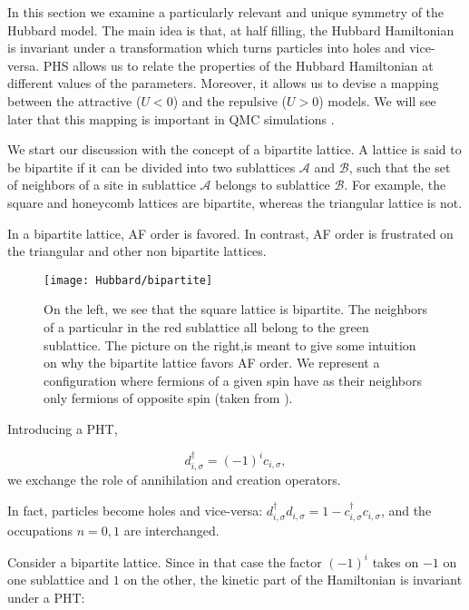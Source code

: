 In this section we examine a particularly relevant and unique symmetry of the Hubbard model.
The main idea is that, at half filling, the Hubbard Hamiltonian is invariant under a transformation which turns particles into holes and vice-versa.
\ac{PHS} allows us to relate the properties of the Hubbard Hamiltonian at different values of the parameters.
Moreover, it allows us to devise a mapping between the attractive ($U < 0$) and the repulsive ($U > 0$) models.
We will see later that this mapping is important in QMC simulations \cite{alavi_quantum_2016}.

We start our discussion with the concept of a bipartite lattice.
A lattice is said to be bipartite if it can be divided into two sublattices $\mathcal{A}$ and $\mathcal{B}$, such that the set of neighbors of a site in sublattice $\mathcal{A}$ belongs to sublattice $\mathcal{B}$.
For example, the square and honeycomb lattices are bipartite, whereas the triangular lattice is not.

In a bipartite lattice, \ac{AF} order is favored.
In contrast, AF order is frustrated on the triangular and other non bipartite lattices.

\begin{figure}[H]\label{fig:bipartite}
\centering
\texttt{[image: Hubbard/bipartite]}
\caption[Bipartite lattices and antiferromagnetic order.]{On the left, we see that the square lattice is bipartite.
The neighbors of a particular in the red sublattice all belong to the green sublattice.
The picture on the right,is meant to give some intuition on why the bipartite lattice favors \ac{AF} order.
We represent a configuration where fermions of a given spin have as their neighbors only fermions of opposite spin (taken from \cite{alavi_quantum_2016}). }
\end{figure}

Introducing a \ac{PHT},

\begin{equation}\label{eq:PHT}
d_{ i, \sigma}^\dagger = (-1)^i c_{i, \sigma} ,
\end{equation}
we exchange the role of annihilation and creation operators.

In fact, particles become holes and vice-versa: $d_{ i, \sigma}^\dagger d_{ i, \sigma} = 1 - c_{ i, \sigma}^\dagger c_{ i, \sigma} $, and the occupations $n = 0, 1$ are interchanged.

Consider a bipartite lattice.
Since in that case the factor $(-1)^i$ takes on $-1$ on one sublattice and $1$ on the other, the kinetic part of the Hamiltonian is invariant under a \ac{PHT}:

